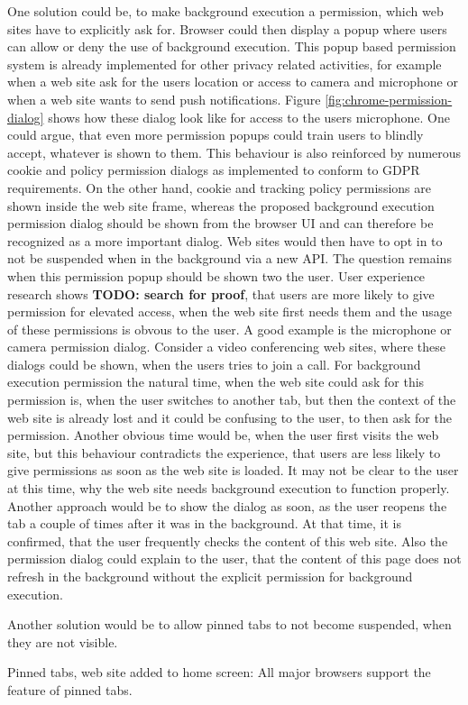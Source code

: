 \documentclass[article,type=bsc,colorback,accentcolor=tud9c]{tudthesis}
\begin{document}
  One solution could be, to make background execution a permission, which web sites have to explicitly ask for. Browser could then display a popup where users can allow or deny the use of background execution. This popup based permission system is already implemented for other privacy related activities, for example when a web site ask for the users location or access to camera and microphone or when a web site wants to send push notifications. Figure \ref{fig:chrome-permission-dialog} shows how these dialog look like for access to the users microphone. One could argue, that even more permission popups could train users to blindly accept, whatever is shown to them. This behaviour is also reinforced by numerous cookie and policy permission dialogs as implemented to conform to GDPR requirements. On the other hand, cookie and tracking policy permissions are shown inside the web site frame, whereas the proposed background execution permission dialog should be shown from the browser UI and can therefore be recognized as a more important dialog. Web sites would then have to opt in to not be suspended when in the background via a new API. The question remains when this permission popup should be shown two the user. User experience research shows \textbf{TODO: search for proof}, that users are more likely to give permission for elevated access, when the web site first needs them and the usage of these permissions is obvous to the user. A good example is the microphone or camera permission dialog. Consider a video conferencing web sites, where these dialogs could be shown, when the users tries to join a call. For background execution permission the natural time, when the web site could ask for this permission is, when the user switches to another tab, but then the context of the web site is already lost and it could be confusing to the user, to then ask for the permission. Another obvious time would be, when the user first visits the web site, but this behaviour contradicts the experience, that users are less likely to give permissions as soon as the web site is loaded. It may not be clear to the user at this time, why the web site needs background execution to function properly. Another approach would be to show the dialog as soon, as the user reopens the tab a couple of times after it was in the background. At that time, it is confirmed, that the user frequently checks the content of this web site. Also the permission dialog could explain to the user, that the content of this page does not refresh in the background without the explicit permission for background execution.

  Another solution would be to allow pinned tabs to not become suspended, when they are not visible.

  Pinned tabs, web site added to home screen: All major browsers support the feature of pinned tabs.

  

  
  \newpage
  \printbibliography[heading=bibnumbered]

   
\end{document}
